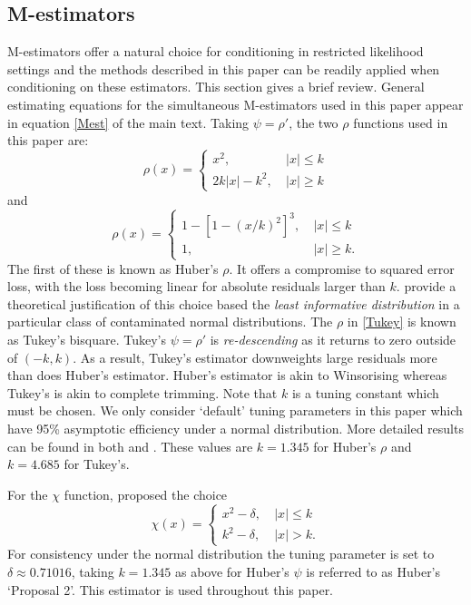 \documentclass[ba]{imsart}
\begin{document}
\subsection{M-estimators}
\label{sec:Mestimators}
M-estimators offer a natural choice for conditioning in restricted likelihood settings and the methods described in this paper can be readily applied when conditioning on these estimators. This section gives a brief review. General estimating equations for the simultaneous M-estimators used in this paper appear in equation \ref{Mest} of the main text. Taking $\psi = \rho'$, the two $\rho$ functions used in this paper are: 
\begin{equation}
\label{Huber}
\rho(x)=
\begin{cases}
x^2, & \  |x|\leq k \\
2k|x|-k^2,&\ |x|\geq k 
\end{cases}
\end{equation}
and 
\begin{equation}
\label{Tukey}
\rho(x)=
\begin{cases}
1-[1-(x/k)^2]^3, & \  |x|\leq k \\
1, &\ |x|\geq k .
\end{cases}
\end{equation}
The first of these is known as Huber's $\rho$. It offers a compromise to squared error loss, with the loss becoming linear for absolute residuals larger than $k$. \cite{huber2009} provide a theoretical justification of this choice based the \textit{least informative distribution} in a particular class of contaminated normal distributions. The $\rho$ in \eqref{Tukey} is known as Tukey's bisquare. Tukey's $\psi = \rho'$ is \textit{re-descending} as it returns to zero outside of $(-k,k)$. As a result, Tukey's estimator downweights large residuals more than does Huber's estimator. Huber's estimator is akin to Winsorising whereas Tukey's is akin to complete trimming. Note that $k$ is a tuning constant which must be chosen. We only consider `default' tuning parameters in this paper which have 95\% asymptotic efficiency under a normal distribution. More detailed results can be found in both \cite{huber2009} and \cite{maronna2006}. These values are $k=1.345$ for Huber's $\rho$ and $k=4.685$ for Tukey's. 

For the $\chi$ function, \cite{huber1964} proposed the choice 
\begin{equation}
\label{HuberScale}
\chi(x)=
\begin{cases}
x^2-\delta, &\ |x|\leq k\\
k^2-\delta, &\ |x|> k .
\end{cases}
\end{equation}
For consistency under the normal distribution the tuning parameter is set to $\delta\approx 0.71016$, taking $k = 1.345$ as above for Huber's $\psi$ is
referred to as Huber's `Proposal 2'. This estimator is used throughout this paper. 







\end{document}
